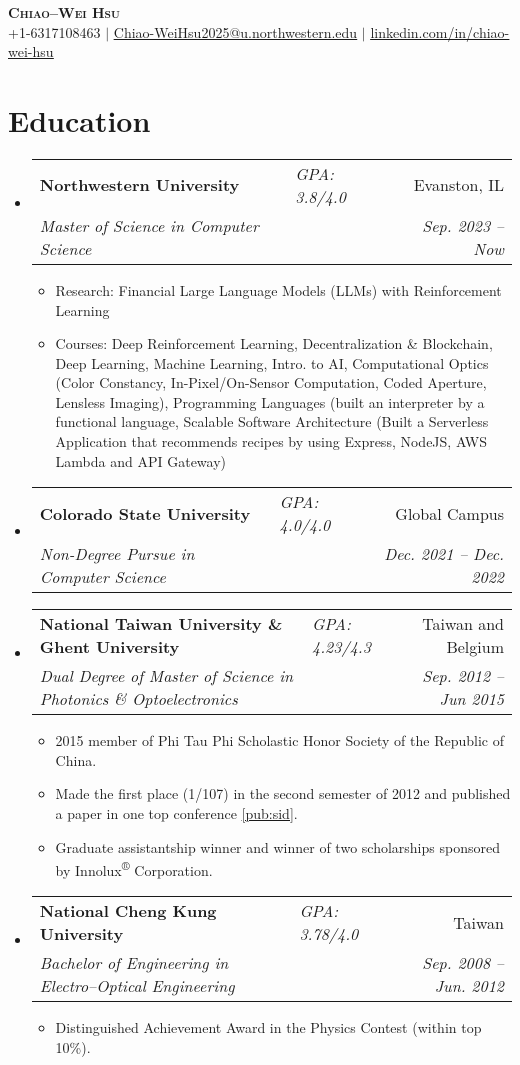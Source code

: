 \documentclass[letterpaper,11pt]{article}
\makeatletter
\newcommand{\resumeItem}[1]{
  \item\small{
    {#1 \vspace{-2pt}}
  }
}
\newcommand{\resumeSubheadingII}[5]{
  \vspace{-2pt}\item
    \begin{tabular*}{0.97\textwidth}[t]{ll@{\extracolsep{\fill}}r}
      \textbf{#1} & \textit{\small#5} & #2 \\
      \textit{\small#3} & \textit{} & \textit{\small #4} \\
    \end{tabular*}\vspace{-7pt}
}
\newcommand{\resumeSubHeadingListStart}{\begin{itemize}[leftmargin=0.1in, label={}]}
\newcommand{\resumeSubHeadingListEnd}{\end{itemize}}
\newcommand{\resumeItemListStart}{\begin{itemize}}
\newcommand{\resumeItemListEnd}{\end{itemize}\vspace{-5pt}}
\makeatother
\begin{document}

\begin{center}
    \textbf{\Huge \scshape Chiao--Wei Hsu} \\ \vspace{1pt}
    \small +1-6317108463 $|$ \href{mailto:Chiao-WeiHsu2025@u.northwestern.edu}{\underline{Chiao-WeiHsu2025@u.northwestern.edu}} $|$ 
    \href{https://linkedin.com/in/chiao-wei-hsu}{\underline{linkedin.com/in/chiao-wei-hsu}}
\end{center}


\section{Education}
  \resumeSubHeadingListStart
    \resumeSubheadingII
      {Northwestern University}{Evanston, IL}
      {Master of Science in Computer Science}{Sep. 2023 -- Now}{GPA: 3.8/4.0}
      \resumeItemListStart
        \resumeItem{Research: Financial Large Language Models (LLMs) with Reinforcement Learning}
        \resumeItem{Courses: Deep Reinforcement Learning, Decentralization \& Blockchain, Deep Learning, Machine Learning, Intro. to AI, Computational Optics (Color Constancy, In-Pixel/On-Sensor Computation, Coded Aperture, Lensless Imaging), Programming Languages (built an interpreter by a functional language, Scalable Software Architecture (Built a Serverless Application that recommends recipes by using Express, NodeJS, AWS Lambda and API Gateway)}
      \resumeItemListEnd
    \resumeSubheadingII
      {Colorado State University}{Global Campus}
      {Non-Degree Pursue in Computer Science}{Dec. 2021 -- Dec. 2022}{GPA: 4.0/4.0}
      
    \resumeSubheadingII
      {National Taiwan University \& Ghent University}{Taiwan and Belgium}
      {Dual Degree of Master of Science in Photonics \& Optoelectronics}{Sep. 2012 -- Jun 2015}{GPA: 4.23/4.3}
      \resumeItemListStart
        \resumeItem{2015 member of Phi Tau Phi Scholastic Honor Society of the Republic of China.}
        \resumeItem{Made the first place (1/107) in the second semester of 2012 and published a paper in one top conference \ref{pub:sid}.}
        \resumeItem {Graduate assistantship winner and winner of two scholarships sponsored by Innolux\textsuperscript{®} Corporation.}
      \resumeItemListEnd
    \resumeSubheadingII
      {National Cheng Kung University}{Taiwan}{Bachelor of Engineering in Electro--Optical Engineering}{Sep. 2008 -- Jun. 2012}{GPA: 3.78/4.0}
      \resumeItemListStart
        \resumeItem{Distinguished Achievement Award in the Physics Contest (within top 10\%).}
      \resumeItemListEnd
  \resumeSubHeadingListEnd
\end{document}
